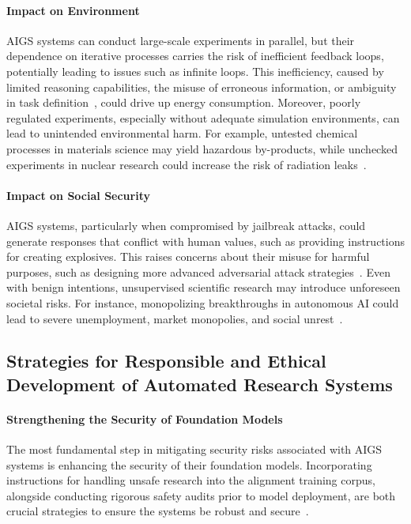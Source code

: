 \documentclass{article} %
\newcommand{\AIGS}{AIGS\xspace}
\begin{document}
\paragraph{Impact on Environment}
\AIGS systems can conduct large-scale experiments in parallel, but their dependence on iterative processes carries the risk of inefficient feedback loops, potentially leading to issues such as infinite loops.
This inefficiency, caused by limited reasoning capabilities, the misuse of erroneous information, or ambiguity in task definition~\citep{yang2024towards}, could drive up energy consumption.
Moreover, poorly regulated experiments, especially without adequate simulation environments, can lead to unintended environmental harm.
For example, untested chemical processes in materials science may yield hazardous by-products, while unchecked experiments in nuclear research could increase the risk of radiation leaks~\citep{tang2024prioritizing}.

\paragraph{Impact on Social Security}
\AIGS systems, particularly when compromised by jailbreak attacks, could generate responses that conflict with human values, such as providing instructions for creating explosives.
This raises concerns about their misuse for harmful purposes, such as designing more advanced adversarial attack strategies~\citep{tang2024prioritizing, si2024can, lu2024aiscientist, kumar2024can, hu2024nova}.
Even with benign intentions, unsupervised scientific research may introduce unforeseen societal risks.
For instance, monopolizing breakthroughs in autonomous AI could lead to severe unemployment, market monopolies, and social unrest~\citep{tang2024prioritizing}.

\subsection{Strategies for Responsible and Ethical Development of Automated Research Systems}


\paragraph{Strengthening the Security of Foundation Models}
The most fundamental step in mitigating security risks associated with \AIGS systems is enhancing the security of their foundation models.
Incorporating instructions for handling unsafe research into the alignment training corpus, alongside conducting rigorous safety audits prior to model deployment, are both crucial strategies to ensure the systems be robust and secure~\citep{tang2024prioritizing}.
\end{document}

